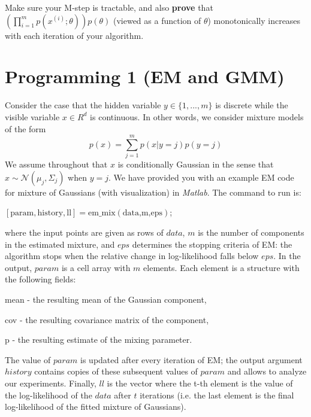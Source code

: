 \documentclass{article}
\theoremstyle{definition}
\theoremstyle{definition}
\theoremstyle{remark}
\begin{document}
Make sure your M-step is tractable, and also \textbf{prove} that $(\prod_{i = 1}^mp(x^{(i)};\theta))p(\theta)$ (viewed as a
function of $\theta$) monotonically increases with each iteration of your algorithm.

\section*{Programming 1 (EM and GMM)}

Consider the case that the hidden variable $y \in \{1, ..., m\}$ is discrete while the visible variable $x \in R^d$ is continuous. In other words, we consider mixture models of the form
\begin{equation}
	p(x) = \sum_{j = 1}^m p(x|y = j)p(y=j)
\end{equation}
We assume throughout that $x$ is conditionally Gaussian in the sense that $x \sim \mathcal{N}(\mu_j
, \Sigma_j)$ when $y = j$. We have provided you with an example EM code for mixture of Gaussians (with visualization) in \emph{Matlab}.
The command to run is:

$[\text{param},\text{history},\text{ll}] = \text{em}\_\text{mix}(\text{data,m,eps})$;

where the input points are given as rows of $data$, $m$ is the number of components in the
estimated mixture, and $eps$ determines the stopping criteria of EM: the algorithm stops
when the relative change in log-likelihood falls below $eps$. In the output, $param$ is a cell
array with $m$ elements. Each element is a structure with the following fields:

mean - the resulting mean of the Gaussian component,

cov - the resulting covariance matrix of the component,

p - the resulting estimate of the mixing parameter.

The value of $param$ is updated after every iteration of EM; the output argument $history$
contains copies of these subsequent values of $param$ and allows to analyze our experiments.
Finally, $ll$ is the vector where the t-th element is the value of the log-likelihood of the $data$
after $t$ iterations (i.e. the last element is the final log-likelihood of the fitted mixture of
Gaussians).
\end{document}
